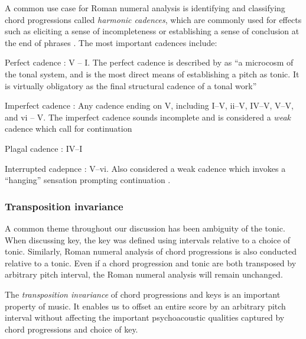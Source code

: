 
A common use case for Roman numeral analysis is identifying and classifying
chord progressions called \emph{harmonic cadences}, which are commonly used for
effects such as eliciting a sense of incompleteness
\citep{jonas1982introduction} or establishing a sense of conclusion at the end
of phrases \citep{randel1999harvard}. The most important cadences include:
\begin{definition}
  \item[Perfect cadence]: \RN{5} -- \RN{1}. The perfect cadence is described by
    \citet{randel1999harvard} as ``a microcosm of the tonal system, and is the
    most direct means of establishing a pitch as tonic. It is virtually
    obligatory as the final structural cadence of a tonal work''
  \item[Imperfect cadence]: Any cadence ending on \RN{5}, including
    \RN{1}--\RN{5}, \Rn{2}--\RN{5}, \RN{4}--\RN{5}, \RN{5}--\RN{5}, and \Rn{6}
    -- \RN{5}. The imperfect cadence sounds incomplete and is considered
    a \emph{weak} cadence which call for continuation \citep{jonas1982introduction}
  \item[Plagal cadence]: \RN{4}--\RN{1}
  \item[Interrupted cadepnce]: \RN{5}--\Rn{6}. Also considered a weak cadence
    which invokes a ``hanging'' sensation prompting continuation
    \cite{piston1978harmony}.
\end{definition}

\subsubsection{Transposition invariance}

A common theme throughout our discussion has been ambiguity of the tonic. When
discussing key, the key was defined using intervals relative to a choice of
tonic. Similarly, Roman numeral analysis of chord progressions is also
conducted relative to a tonic. Even if a chord progression and tonic are both
transposed by arbitrary pitch interval, the Roman numeral analysis will remain
unchanged.

The \emph{transposition invariance} of chord progressions and keys is an
important property of music. It enables us to offset an entire score by an
arbitrary pitch interval without affecting the important psychoacoustic
qualities captured by chord progressions and choice of key.

